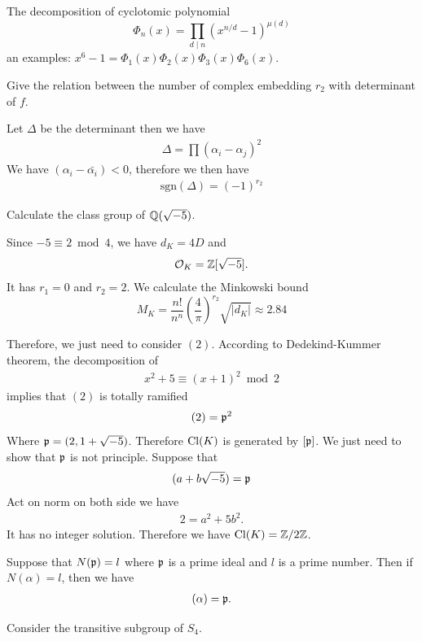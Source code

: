 {\prob The decomposition of cyclotomic polynomial
$$\Phi_n(x) = \prod_{d \mid n} (x^{n/d} - 1)^{\mu(d)}$$
an examples:
$x^6 - 1 = \Phi_1(x)\Phi_2(x)\Phi_3(x)\Phi_6(x).$

\prob Give the relation between the number of complex embedding $r_2$ with determinant of $f$.

Let $\Delta$ be the determinant then we have
\begin{align*}
    \Delta = \prod(\alpha_i-\alpha_j)^2
\end{align*}
We have $(\alpha_i-\bar{\alpha_i})<0$, therefore we then have 
\begin{align*}
    \text{sgn}(\Delta) = (-1)^{r_2}
\end{align*}



\prob Calculate the class group of $\mathbb{Q}(\sqrt{-5})$.

Since $-5\equiv 2\bmod 4$, we have $d_K = 4D$ and 
\begin{align*}
    \mathcal{O}_K = \mathbb{Z}[\sqrt{-5}].
\end{align*}
It has $r_1=0$ and $r_2=2$. 
We calculate the Minkowski bound 
$$M_K = \frac{n!}{n^n} \left(\frac{4}{\pi}\right)^{r_2} \sqrt{|d_K|} \approx 2.84$$

Therefore, we just need to consider $(2)$. According to Dedekind-Kummer theorem, the decomposition of 
\begin{align*}
    x^2+5 \equiv (x+1)^2 \bmod 2
\end{align*}
implies that $(2)$ is totally ramified 
\begin{align*}
    (2) = \mathfrak{p}^2
\end{align*}
Where $\mathfrak{p}=(2,1+\sqrt{-5})$. Therefore $\operatorname{Cl}(K)$ is generated by $[\mathfrak{p}]$. We just need to show that $\mathfrak{p}$
is not principle. Suppose that 
\begin{align*}
    (a+b\sqrt{-5}) = \mathfrak{p}
\end{align*}
Act on norm on both side we have 
\begin{align*}
    2= a^2+5b^2.
\end{align*}
It has no integer solution. Therefore we have $\operatorname{Cl}(K)=\mathbb{Z}/2\mathbb{Z}$. 


\prob Suppose that $N(\mathfrak{p})=l$ where $\mathfrak{p}$ is a prime ideal and $l$ is a prime number. Then if $N(\alpha) = l$, then we have 
\begin{align*}
    (\alpha) = \mathfrak{p}.
\end{align*}


\prob Consider the transitive subgroup of $S_4$.

}
